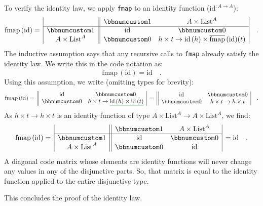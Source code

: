 To verify the identity law, we apply \lstinline!fmap! to an identity
function ($\text{id}^{:A\rightarrow A}$):
\[
\text{fmap}\,(\text{id})=\,\begin{array}{|c||cc|}
 & \bbnum 1 & A\times\text{List}^{A}\\
\hline \bbnum 1 & \text{id} & \bbnum 0\\
A\times\text{List}^{A} & \bbnum 0 & h\times t\rightarrow\text{id}\,(h)\times\overline{\text{fmap}}\,(\text{id})(t)
\end{array}\quad.
\]
The inductive assumption says that any recursive calls to \lstinline!fmap!
already satisfy the identity law. We write this in the code notation
as:
\[
\overline{\text{fmap}}\,(\text{id})=\text{id}\quad.
\]
Using this assumption, we write (omitting types for brevity):
\[
\text{fmap}\,(\text{id})=\,\begin{array}{||cc|}
\text{id} & \bbnum 0\\
\bbnum 0 & h\times t\rightarrow\gunderline{\text{id}\,(h)\times\text{id}\,(t)}
\end{array}\,=\,\begin{array}{||cc|}
\text{id} & \bbnum 0\\
\bbnum 0 & h\times t\rightarrow h\times t
\end{array}\quad.
\]
As $h\times t\rightarrow h\times t$ is an identity function of type
$A\times\text{List}^{A}\rightarrow A\times\text{List}^{A}$, we find:
\[
\text{fmap}\,(\text{id})=\,\begin{array}{|c||cc|}
 & \bbnum 1 & A\times\text{List}^{A}\\
\hline \bbnum 1 & \text{id} & \bbnum 0\\
A\times\text{List}^{A} & \bbnum 0 & \text{id}
\end{array}\,=\text{id}\quad.
\]
A diagonal code matrix whose elements are identity functions will
never change any values in any of the disjunctive parts. So, that
matrix is equal to the identity function applied to the entire disjunctive
type. 

This concludes the proof of the identity law.

